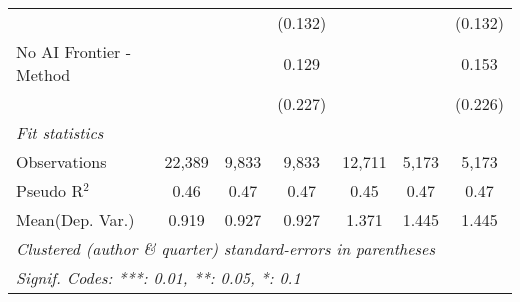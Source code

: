 \begin{tabular}{lcccccc}
                           &               &               & (0.132)       &               &               & (0.132)\\   
   No AI Frontier - Method &               &               & 0.129         &               &               & 0.153\\   
                           &               &               & (0.227)       &               &               & (0.226)\\   
   \midrule
   \emph{Fit statistics}\\
   Observations            & 22,389        & 9,833         & 9,833         & 12,711        & 5,173         & 5,173\\  
   Pseudo R$^2$            & 0.46          & 0.47          & 0.47          & 0.45          & 0.47          & 0.47\\  
Mean(Dep. Var.) & 0.919 & 0.927 & 0.927 & 1.371 & 1.445 & 1.445 \\
   \midrule \midrule
   \multicolumn{7}{l}{\emph{Clustered (author \& quarter) standard-errors in parentheses}}\\
   \multicolumn{7}{l}{\emph{Signif. Codes: ***: 0.01, **: 0.05, *: 0.1}}\\
\end{tabular}
\par\endgroup
